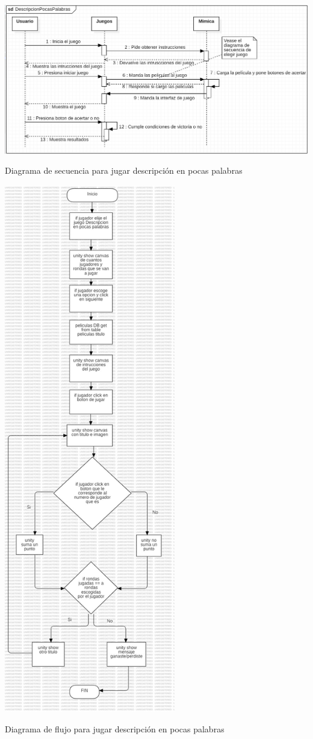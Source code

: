 \documentclass[12pt, oneside, letterpaper]{book}
\begin{document}
\begin{center}
	\centering
		\includegraphics[width=1.29\textwidth]{DSFNDescripcionEnPocasPalabras.png}

	\caption{Diagrama de secuencia para jugar descripción en pocas palabras}
	\label{DSFNDescric}
\end{center}
\begin{center}
	\centering
		\includegraphics[width=0.56\textwidth]{DFFNDescripcionEnPocasPalabras.jpg}

	\caption{Diagrama de flujo para jugar descripción en pocas palabras}
	\label{DFFNDescr}
\end{center}
\end{document}
